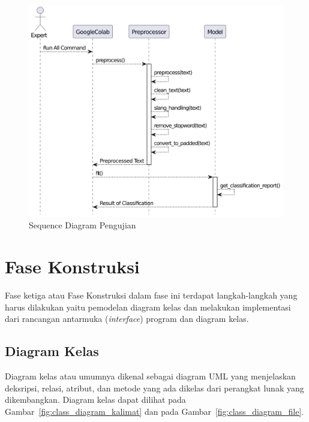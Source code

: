 \begin{figure}[H]
  \centering
  \includegraphics[width=\textwidth]{assets/sequence_diagram_test.png}
  \caption{Sequence Diagram Pengujian}
  \label{fig:sequence_diagram_test}
\end{figure}


\section{Fase Konstruksi}
Fase ketiga atau Fase Konstruksi dalam fase ini terdapat langkah-langkah yang harus dilakukan yaitu
pemodelan diagram kelas dan melakukan implementasi dari rancangan antarmuka (\emph{interface})
program dan diagram kelas.

\subsection{Diagram Kelas}
Diagram kelas atau umumnya dikenal sebagai diagram UML yang menjelaskan deksripsi, relasi, atribut, dan metode yang
ada dikelas dari perangkat lunak yang dikembangkan. Diagram kelas dapat dilihat pada
Gambar~\ref{fig:class_diagram_kalimat} dan pada Gambar~\ref{fig:class_diagram_file}.

